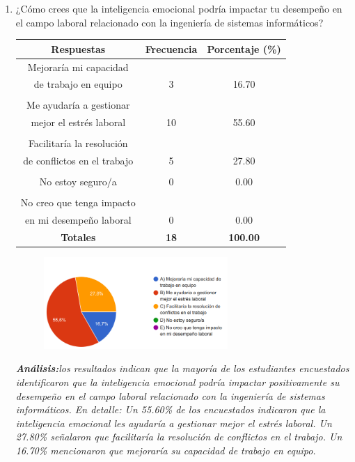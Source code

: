 \documentclass[journal]{IEEEtran}
\begin{document}
\begin{enumerate}
\item¿Cómo crees que la inteligencia emocional podría impactar tu desempeño en el campo laboral relacionado con la ingeniería de sistemas informáticos?
	\begin{table}[H]
		\renewcommand{\arraystretch}{1.3}
		\centering
		\begin{tabular}{c c c}
			\hline
			\textbf{Respuestas} & \textbf{Frecuencia} & \textbf{Porcentaje (\%)}\\
			\hline
			Mejoraría mi capacidad \\de trabajo en equipo & 3 & 16.70 \\
			\\Me ayudaría a gestionar \\mejor el estrés laboral & 10 & 55.60 \\
			\\Facilitaría la resolución\\ de conflictos en el trabajo & 5 & 27.80\\
			\\No estoy seguro/a & 0 & 0.00\\
			\\No creo que tenga impacto\\ en mi desempeño laboral & 0 & 0.00\\
			\hline
			\textbf{Totales} &\textbf{18}& \textbf{100.00}\\
			\hline
		\end{tabular}
	\end{table}
	\begin{figure}[h]
		\centering
		\includegraphics[width=07cm]{Pregunta 7}
	\end{figure}
	\textit{\textbf{Análisis:}los resultados indican que la mayoría de los estudiantes encuestados identificaron que la inteligencia emocional podría impactar positivamente su desempeño en el campo laboral relacionado con la ingeniería de sistemas informáticos. En detalle:
Un 55.60\% de los encuestados indicaron que la inteligencia emocional les ayudaría a gestionar mejor el estrés laboral.
Un 27.80\% señalaron que facilitaría la resolución de conflictos en el trabajo.
Un 16.70\% mencionaron que mejoraría su capacidad de trabajo en equipo.
}
\end{enumerate}
\end{document}
